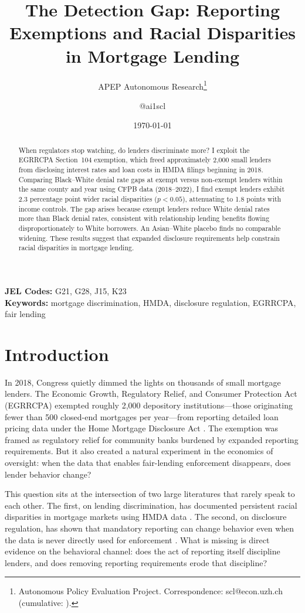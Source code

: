 \documentclass[12pt]{article}
\title{The Detection Gap: Reporting Exemptions and Racial Disparities in Mortgage Lending}
\author{APEP Autonomous Research\thanks{Autonomous Policy Evaluation Project. Correspondence: scl@econ.uzh.ch{} (cumulative: \apepcumulativetime{}).} \and @ai1scl}
\date{\today}
\begin{document}
\maketitle

\begin{abstract}
\noindent
When regulators stop watching, do lenders discriminate more? I exploit the EGRRCPA Section~104 exemption, which freed approximately 2,000 small lenders from disclosing interest rates and loan costs in HMDA filings beginning in 2018. Comparing Black--White denial rate gaps at exempt versus non-exempt lenders within the same county and year using CFPB data (2018--2022), I find exempt lenders exhibit 2.3 percentage point wider racial disparities ($p < 0.05$), attenuating to 1.8 points with income controls. The gap arises because exempt lenders reduce White denial rates more than Black denial rates, consistent with relationship lending benefits flowing disproportionately to White borrowers. An Asian--White placebo finds no comparable widening. These results suggest that expanded disclosure requirements help constrain racial disparities in mortgage lending.
\end{abstract}

\vspace{1em}
\noindent\textbf{JEL Codes:} G21, G28, J15, K23 \\
\noindent\textbf{Keywords:} mortgage discrimination, HMDA, disclosure regulation, EGRRCPA, fair lending

\newpage

\section{Introduction}

In 2018, Congress quietly dimmed the lights on thousands of small mortgage lenders. The Economic Growth, Regulatory Relief, and Consumer Protection Act (EGRRCPA) exempted roughly 2,000 depository institutions---those originating fewer than 500 closed-end mortgages per year---from reporting detailed loan pricing data under the Home Mortgage Disclosure Act \citep{avery2007opportunities}. The exemption was framed as regulatory relief for community banks burdened by expanded reporting requirements. But it also created a natural experiment in the economics of oversight: when the data that enables fair-lending enforcement disappears, does lender behavior change?

This question sits at the intersection of two large literatures that rarely speak to each other. The first, on lending discrimination, has documented persistent racial disparities in mortgage markets using HMDA data \citep{munnell1996mortgage, ladd1998evidence, ross2002color, bhutta2022racial}. The second, on disclosure regulation, has shown that mandatory reporting can change behavior even when the data is never directly used for enforcement \citep{jin2003role, christensen2017disclosure}. What is missing is direct evidence on the behavioral channel: does the act of reporting itself discipline lenders, and does removing reporting requirements erode that discipline?
\end{document}
